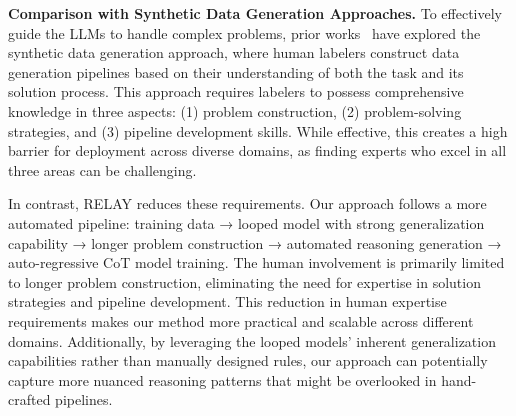 \textbf{Comparison with Synthetic Data Generation Approaches. }
To effectively guide the LLMs to handle complex problems, prior works~\cite{hendrycks2021measuring,lightman2024lets} have explored the synthetic data generation approach, where human labelers construct data generation pipelines based on their understanding of both the task and its solution process. This approach requires labelers to possess comprehensive knowledge in three aspects: (1) problem construction, (2) problem-solving strategies, and (3) pipeline development skills. While effective, this creates a high barrier for deployment across diverse domains, as finding experts who excel in all three areas can be challenging.

In contrast, RELAY  reduces these requirements. Our approach follows a more automated pipeline: training data → looped model with strong generalization capability → longer problem construction → automated reasoning generation → auto-regressive CoT model training. The human involvement is primarily limited to longer problem construction, eliminating the need for expertise in solution strategies and pipeline development. This reduction in human expertise requirements makes our method more practical and scalable across different domains. Additionally, by leveraging the looped models' inherent generalization capabilities rather than manually designed rules, our approach can potentially capture more nuanced reasoning patterns that might be overlooked in hand-crafted pipelines.


